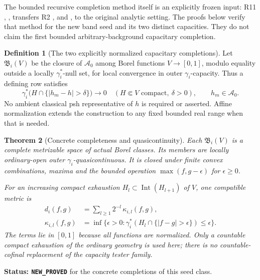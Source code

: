 \documentclass[11pt,a4paper]{article}
\numberwithin{equation}{section}
\newtheorem{theorem}{Theorem}[section]
\theoremstyle{definition}
\newtheorem{definition}[theorem]{Definition}
\theoremstyle{remark}
\begin{document}
The bounded recursive completion method itself is an explicitly
frozen input: R11 ,
, transfers R2
,  and
, to the original analytic setting.
The proofs below verify that method for the new band seed and
its two distinct capacities. They do not claim the first bounded
arbitrary-background capacitary completion.

\begin{definition}[The two explicitly normalized capacitary completions]
\label{def:r12-band-capacitary-completion}
Let $\mathfrak B_i(V)$ be the closure of $\mathcal A_0$ among
Borel functions $V\to[0,1]$, modulo equality outside a locally
$\gamma_i^*$-null set, for local convergence in outer
$\gamma_i$-capacity. Thus a defining row satisfies
\[
 \gamma_i^*\bigl(H\cap\{|h_m-h|>\delta\}\bigr)\longrightarrow0
       \quad(H\Subset V\text{ compact},\ \delta>0),
       \qquad h_m\in\mathcal A_0.
 \tag{BC2}
\]
No ambient classical psh representative of $h$ is required or
asserted. Affine normalization extends the construction to any
fixed bounded real range when that is needed.
\end{definition}

\begin{theorem}[Concrete completeness and quasicontinuity]
\label{thm:r12-band-completion-metric}
Each $\mathfrak B_i(V)$ is a complete metrizable space of actual
Borel classes. Its members are locally ordinary-open outer
$\gamma_i$-quasicontinuous. It is closed under finite convex
combinations, maxima and the bounded operation
$\max(f,g-\epsilon)$ for $\epsilon\geq0$.

For an increasing compact exhaustion
$H_l\subset\operatorname{Int}(H_{l+1})$ of $V$, one compatible
metric is
\[
 \begin{split}
 d_i(f,g)&=\sum_{l\geq1}2^{-l}\,\kappa_{i,l}(f,g),\\
 \kappa_{i,l}(f,g)&=\inf\{\epsilon>0:
  \gamma_i^*(H_l\cap\{|f-g|>\epsilon\})\leq\epsilon\}.
 \end{split}
 \tag{BC3}
\]
The terms lie in $[0,1]$ because all functions are normalized.
Only a countable compact exhaustion of the ordinary geometry is
used here; there is no countable-cofinal replacement of the
capacity tester family.
\end{theorem}

\noindent\textbf{Status: \texttt{NEW\_PROVED}} for the concrete
completions of this seed class.
\end{document}

